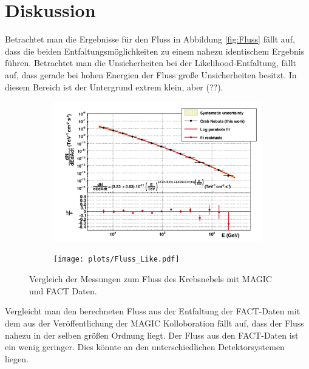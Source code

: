 \section{Diskussion}
Betrachtet man die Ergebnisse für den Fluss in Abbildung \ref{fig:Fluss} fällt auf, dass die beiden Entfaltungsmöglichkeiten zu einem nahezu identischem Ergebnis führen. Betrachtet man die Unsicherheiten bei der Likelihood-Entfaltung, fällt auf, dass gerade bei hohen Energien der Fluss große Unsicherheiten besitzt. In diesem Bereich ist der Untergrund extrem klein, aber (??).\\
\begin{figure}
	\begin{subfigure}[c]{0.5\textwidth}
		\includegraphics[width=\textwidth]{graphics/Magic.png}
	\end{subfigure}
	\begin{subfigure}[c]{0.5\textwidth}
		\texttt{[image: plots/Fluss\_Like.pdf]}
	\end{subfigure}
	\caption{Vergleich der Messungen zum Fluss des Krebsnebels mit MAGIC und FACT Daten.}
\end{figure}
Vergleicht man den berechneten Fluss aus der Entfaltung der FACT-Daten mit dem aus der Veröffentlichung \cite{Aleksic:2014jva} der MAGIC Kolloboration fällt auf, dass der Fluss nahezu in der selben größen Ordnung liegt. Der Fluss aus den FACT-Daten ist ein wenig geringer. Dies könnte an den unterschiedlichen Detektorsystemen liegen.
